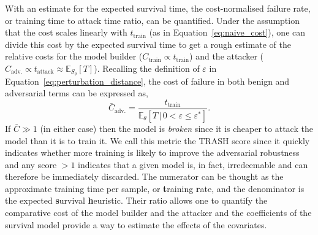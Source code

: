 With an estimate for the expected survival time, the cost-normalised failure rate, or training time to attack time ratio, can be quantified. Under the assumption that the cost scales linearly with $t_{\mathrm{train}}$ (as in Equation~\ref{eq:naive_cost}), one can divide this cost by the expected survival time to get a rough estimate of the relative costs for the model builder ($C_{\mathrm{train}} \propto t_{\mathrm{train}}$) and the attacker ($C_{\mathrm{adv.}} \propto t_{\mathrm{attack}} \approx \mathbb{E}_{S_\theta}[T]$). Recalling the definition of $\varepsilon$ in Equation~\ref{eq:perturbation_distance}, the cost of failure in both benign and adversarial terms can be expressed as,
\begin{equation}
	\bar{C}_{\mathrm{adv.}}=\frac{t_{\mathrm{train}}}{\mathbb{E}_{\theta}[T \,|\, 0 < \varepsilon \leq \varepsilon^*]}.
	\label{eq:cost}
\end{equation}
If $\bar{C} \gg 1$ (in either case) then the model is \textit{broken} since it is cheaper to attack the model than it is to train it.
We call this metric the TRASH score since it quickly indicates whether more training is likely to improve the adversarial robustness and any score $ > 1$ indicates that a given model is, in fact, irredeemable and can therefore be immediately discarded. The numerator can be thought as the approximate training time per sample, or \textbf{t}raining \textbf{r}ate, and the denominator is the expected \textbf{s}urvival \textbf{h}euristic. Their ratio allows one to quantify the comparative cost of the model builder and the attacker and the coefficients of the survival model provide a way to estimate the effects of the covariates.


